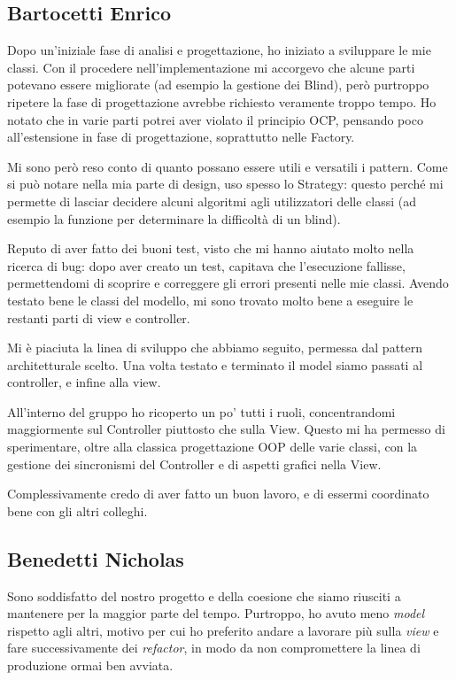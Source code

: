 \documentclass[a4paper,12pt]{report}
\begin{document}
\subsection{Bartocetti Enrico}
Dopo un'iniziale fase di analisi e progettazione, ho iniziato a sviluppare le mie classi.
Con il procedere nell'implementazione mi accorgevo che alcune parti potevano essere migliorate (ad esempio la gestione dei Blind), però purtroppo ripetere la fase di progettazione avrebbe richiesto veramente troppo tempo.
Ho notato che in varie parti potrei aver violato il principio OCP, pensando poco all'estensione in fase di progettazione, soprattutto nelle Factory.

Mi sono però reso conto di quanto possano essere utili e versatili i pattern.
Come si può notare nella mia parte di design, uso spesso lo Strategy: questo perché mi permette di lasciar decidere alcuni algoritmi agli utilizzatori delle classi (ad esempio la funzione per determinare la difficoltà di un blind).

Reputo di aver fatto dei buoni test, visto che mi hanno aiutato molto nella ricerca di bug: dopo aver creato un test, capitava che l'esecuzione fallisse, permettendomi di scoprire e correggere gli errori presenti nelle mie classi. 
Avendo testato bene le classi del modello, mi sono trovato molto bene a eseguire le restanti parti di view e controller.

Mi è piaciuta la linea di sviluppo che abbiamo seguito, permessa dal pattern architetturale scelto.
Una volta testato e terminato il model siamo passati al controller, e infine alla view.

All'interno del gruppo ho ricoperto un po' tutti i ruoli, concentrandomi maggiormente sul Controller piuttosto che sulla View.
Questo mi ha permesso di sperimentare, oltre alla classica progettazione OOP delle varie classi, con la gestione dei sincronismi del Controller e di aspetti grafici nella View.

Complessivamente credo di aver fatto un buon lavoro, e di essermi coordinato bene con gli altri colleghi.

\subsection{Benedetti Nicholas}
Sono soddisfatto del nostro progetto e della coesione che siamo riusciti a mantenere per la maggior parte del tempo. Purtroppo, ho avuto meno \textit{model} rispetto agli altri, motivo per cui ho preferito andare a lavorare più sulla \textit{view} e fare successivamente dei \textit{refactor}, in modo da non compromettere la linea di produzione ormai ben avviata. 
\end{document}
